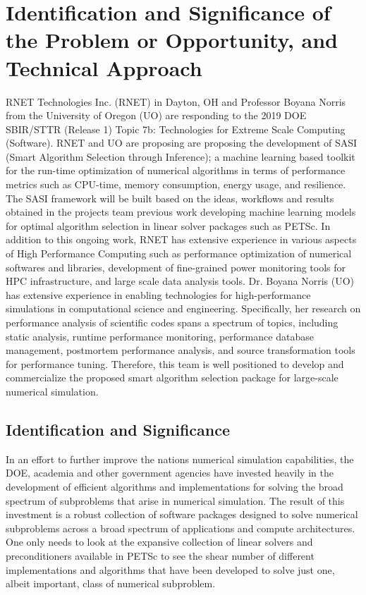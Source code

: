 \section{Identification and Significance of the Problem or Opportunity, and Technical Approach}

RNET Technologies Inc. (RNET) in Dayton, OH and Professor Boyana Norris from the University of Oregon (UO) are responding to the 2019 DOE 
SBIR/STTR (Release 1) Topic 7b: Technologies for Extreme Scale Computing (Software). RNET and UO are proposing are proposing the development of SASI (Smart Algorithm Selection through Inference); a machine learning based toolkit for the run-time optimization of numerical algorithms in terms of performance metrics such as CPU-time, memory consumption, energy usage, and resilience. The SASI framework will be built based on the ideas, workflows and results obtained in the projects team previous work developing machine learning models for optimal algorithm selection in linear solver packages such as PETSc. In addition to this ongoing work, RNET has extensive experience in various aspects of High Performance Computing such as performance 
optimization of numerical softwares and libraries, development of fine-grained power monitoring tools 
for HPC infrastructure, and large scale data analysis tools. Dr. Boyana Norris (UO) has extensive experience 
in enabling technologies for high-performance simulations in computational science and engineering. 
Specifically, her research on performance analysis of scientific codes spans a spectrum of topics, 
including static analysis, runtime performance monitoring, performance database management, postmortem 
performance analysis, and source transformation tools for performance tuning. Therefore, 
this team is well positioned to develop and commercialize the proposed smart algorithm selection package for 
large-scale numerical simulation. 


\subsection{Identification and Significance}
\label{sec:introduction}

In an effort to further improve the nations numerical simulation capabilities, the DOE, academia and other government agencies have invested heavily in the development of efficient algorithms and implementations for solving the broad spectrum of subproblems that arise in numerical simulation.  The result of this investment is a robust collection of software packages designed to solve numerical subproblems across a broad spectrum of applications and compute architectures. One only needs to look at the expansive collection of linear solvers and preconditioners available in PETSc to see the shear number of different implementations and algorithms that have been developed to solve just one, albeit important, class of numerical subproblem.  

